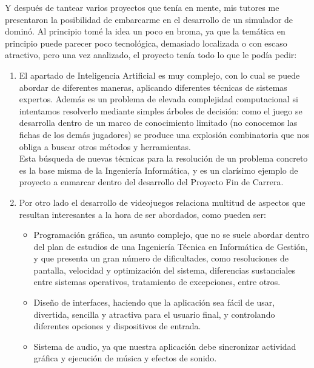 Y después de tantear varios proyectos que tenía en mente, mis tutores me presentaron la posibilidad
de embarcarme en el desarrollo de un simulador de dominó. Al principio tomé la idea un poco en broma,
ya que la temática en principio puede parecer poco tecnológica, demasiado localizada o con escaso
atractivo, pero una vez analizado, el proyecto tenía todo lo que le podía pedir:
\begin{enumerate}
    \item El apartado de Inteligencia Artificial es muy complejo, con lo cual se puede abordar de
            diferentes maneras, aplicando diferentes técnicas de sistemas expertos. Además es un
            problema de elevada complejidad computacional si intentamos resolverlo mediante simples
            árboles de decisión: como el juego se desarrolla dentro de un marco de conocimiento
            limitado (no conocemos las fichas de los demás jugadores) se produce una explosión
            combinatoria que nos obliga a buscar otros métodos y herramientas.\\
            Esta búsqueda de nuevas técnicas para la resolución de un problema concreto es la base
            misma de la Ingeniería Informática, y es un clarísimo ejemplo de proyecto a enmarcar
            dentro del desarrollo del Proyecto Fin de Carrera.
    \item Por otro lado el desarrollo de videojuegos relaciona multitud de aspectos que resultan
            interesantes a la hora de ser abordados, como pueden ser:
            \begin{itemize}
                \item Programación gráfica, un asunto complejo, que no se suele abordar dentro del
                        plan de estudios de una Ingeniería Técnica en Informática de Gestión, y que
                        presenta un gran número de dificultades, como resoluciones de pantalla, velocidad
                        y optimización del sistema, diferencias sustanciales entre sistemas operativos,
                        tratamiento de excepciones, entre otros.
                \item Diseño de interfaces, haciendo que la aplicación sea fácil de usar, divertida,
                        sencilla y atractiva para el usuario final, y controlando diferentes opciones
                        y dispositivos de entrada.
                \item Sistema de audio, ya que nuestra aplicación debe sincronizar actividad gráfica y
                        ejecución de música y efectos de sonido.

\end{itemize}
\end{enumerate}
